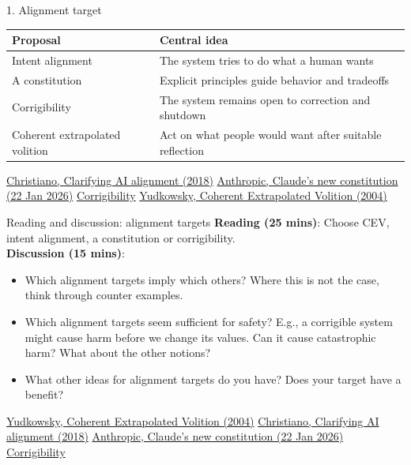 \documentclass[aspectratio=169,11pt]{beamer}
\newcommand{\sources}[1]{\vfill{\fontsize{6.3}{7.5}\selectfont\color{muted}#1\par}}
\begin{document}
\begin{frame}[t,label=fourtargets]{1. Alignment target}
\normalsize\renewcommand{\arraystretch}{1.38}\setlength{\tabcolsep}{3pt}
\begin{tabular}{@{}>{\raggedright\arraybackslash}p{}>{\raggedright\arraybackslash}p{}@{}}\toprule
\textbf{Proposal} & \textbf{Central idea}\\\midrule
Intent alignment & The system tries to do what a human wants\\
A constitution & Explicit principles guide behavior and tradeoffs\\
Corrigibility & The system remains open to correction and shutdown\\
Coherent extrapolated volition & Act on what people would want after suitable reflection\\
\bottomrule\end{tabular}
\sources{\href{https://ai-alignment.com/clarifying-ai-alignment-cec47cd69dd6}{Christiano, Clarifying AI alignment (2018)} \quad \href{https://www.anthropic.com/news/claude-new-constitution}{Anthropic, Claude's new constitution (22 Jan 2026)} \quad \href{https://www.lesswrong.com/w/corrigibility-1}{Corrigibility} \quad \href{https://intelligence.org/files/CEV.pdf}{Yudkowsky, Coherent Extrapolated Volition (2004)}}
\end{frame}

\begin{frame}[t,label=targetexercise]{Reading and discussion: alignment targets}
\textbf{Reading (25 mins)}: Choose CEV, intent alignment, a constitution or corrigibility. \\
\textbf{Discussion (15 mins)}:
\begin{itemize}\setlength{\itemsep}{3.5mm}
\item Which alignment targets imply which others? Where this is not the case, think through counter examples.
\item Which alignment targets seem sufficient for safety? E.g., a corrigible system might cause harm before we change its values. Can it cause catastrophic harm? What about the other notions?
\item What other ideas for alignment targets do you have? Does your target have a benefit?
\end{itemize}
\sources{\href{https://intelligence.org/files/CEV.pdf}{Yudkowsky, Coherent Extrapolated Volition (2004)} \quad \href{https://ai-alignment.com/clarifying-ai-alignment-cec47cd69dd6}{Christiano, Clarifying AI alignment (2018)} \quad \href{https://www.anthropic.com/news/claude-new-constitution}{Anthropic, Claude's new constitution (22 Jan 2026)} \quad \href{https://www.lesswrong.com/w/corrigibility-1}{Corrigibility}}
\end{frame}
\end{document}
